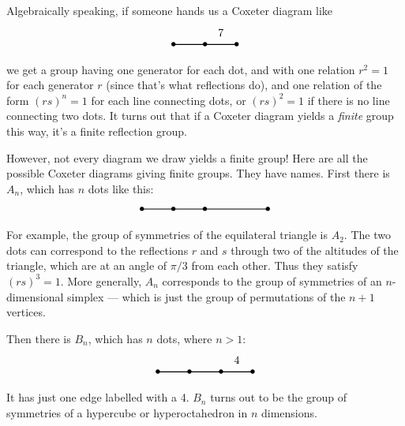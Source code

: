 \documentclass{article}
\begin{document}
Algebraically speaking, if someone hands us a Coxeter diagram like \[
  \begin{tikzpicture}
    \draw[thick] (0,0) node{$\bullet$} to (1,0) node{$\bullet$} to node[label=above:{7}]{} (2,0) node {$\bullet$};
  \end{tikzpicture}
\] we get a group having one generator for each dot, and with one
relation \(r^2 = 1\) for each generator \(r\) (since that's what
reflections do), and one relation of the form \((rs)^n = 1\) for each
line connecting dots, or \((rs)^2 = 1\) if there is no line connecting
two dots. It turns out that if a Coxeter diagram yields a \emph{finite}
group this way, it's a finite reflection group.

However, not every diagram we draw yields a finite group! Here are all
the possible Coxeter diagrams giving finite groups. They have names.
First there is \(A_n\), which has \(n\) dots like this: \[
  \begin{tikzpicture}
    \draw[thick] (0,0) node{$\bullet$} to (1,0) node{$\bullet$} to (2,0) node {$\bullet$} to (4,0) node{$\bullet$};
  \end{tikzpicture}
\] For example, the group of symmetries of the equilateral triangle is
\(A_2\). The two dots can correspond to the reflections \(r\) and \(s\)
through two of the altitudes of the triangle, which are at an angle of
\(\pi/3\) from each other. Thus they satisfy \((rs)^3 = 1\). More
generally, \(A_n\) corresponds to the group of symmetries of an
\(n\)-dimensional simplex --- which is just the group of permutations of
the \(n+1\) vertices.

Then there is \(B_n\), which has \(n\) dots, where \(n > 1\): \[
  \begin{tikzpicture}
    \draw[thick] (0,0) node{$\bullet$} to (1,0) node{$\bullet$} to (2,0) node{$\bullet$} to node[label=above:{4}]{} (3,0) node {$\bullet$};
  \end{tikzpicture}
\] It has just one edge labelled with a 4. \(B_n\) turns out to be the
group of symmetries of a hypercube or hyperoctahedron in \(n\)
dimensions.
\end{document}
